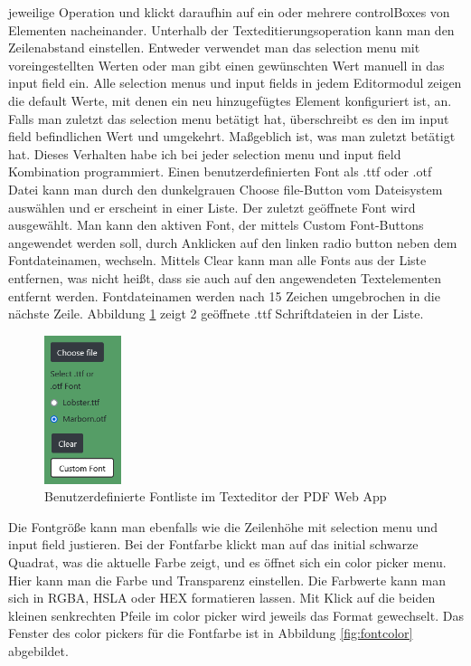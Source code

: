 jeweilige Operation und klickt daraufhin auf ein oder mehrere controlBoxes von Elementen nacheinander. Unterhalb der Texteditierungsoperation kann man den Zeilenabstand einstellen. Entweder verwendet man das selection menu mit voreingestellten Werten oder man gibt einen gewünschten Wert manuell in das input field ein. Alle selection menus und input fields in jedem Editormodul zeigen die default Werte, mit denen ein neu hinzugefügtes Element konfiguriert ist, an. Falls man zuletzt das selection menu betätigt hat, überschreibt es den im input field befindlichen Wert und umgekehrt. Maßgeblich ist, was man zuletzt betätigt hat. Dieses Verhalten habe ich bei jeder selection menu und input field Kombination programmiert. Einen benutzerdefinierten Font als .ttf oder .otf Datei kann man durch den dunkelgrauen Choose file-Button vom Dateisystem auswählen und er erscheint in einer Liste. Der zuletzt geöffnete Font wird ausgewählt. Man kann den aktiven Font, der mittels Custom Font-Buttons angewendet werden soll, durch Anklicken auf den linken radio button neben dem Fontdateinamen, wechseln. Mittels Clear kann man alle Fonts aus der Liste entfernen, was nicht heißt, dass sie auch auf den angewendeten Textelementen entfernt werden. Fontdateinamen werden nach 15 Zeichen umgebrochen in die nächste Zeile. Abbildung \ref{fig:custom-font} zeigt 2 geöffnete .ttf Schriftdateien in der Liste.

\begin{figure}[!htbp]
	\centering
	\includegraphics[width=0.2\textwidth]{"images/custom-font.png"}
	\caption{Benutzerdefinierte Fontliste im Texteditor der PDF Web App}
	\label{fig:custom-font}
\end{figure}

Die Fontgröße kann man ebenfalls wie die Zeilenhöhe mit selection menu und input field justieren. Bei der Fontfarbe klickt man auf das initial schwarze Quadrat, was die aktuelle Farbe zeigt, und es öffnet sich ein color picker menu. Hier kann man die Farbe und Transparenz einstellen. Die Farbwerte kann man sich in RGBA, HSLA oder HEX formatieren lassen. Mit Klick auf die beiden kleinen senkrechten Pfeile im color picker wird jeweils das Format gewechselt. Das Fenster des color pickers für die Fontfarbe ist in Abbildung \ref{fig:fontcolor} abgebildet. 

